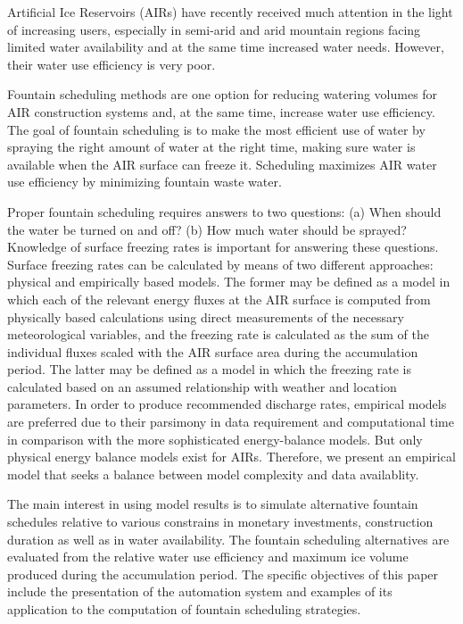 \documentclass[tc, manuscript]{copernicus}
\begin{document}
\introduction

Artificial Ice Reservoirs (AIRs) have recently received much attention in the light of increasing users,
especially in semi-arid and arid mountain regions facing limited water availability and at the same time
increased water needs. However, their water use efficiency is very poor. 

Fountain scheduling methods are one option for reducing watering volumes for AIR construction systems and, at
the same time, increase water use efficiency. The goal of fountain scheduling is to make the most efficient use of water by
spraying the right amount of water at the right time, making sure water is available when the AIR surface can
freeze it. Scheduling maximizes AIR water use efficiency by minimizing fountain waste water.  

Proper fountain scheduling requires answers to two questions: (a) When should the water be turned on and off?
(b) How much water should be sprayed? Knowledge of surface freezing rates is important for answering these
questions. Surface freezing rates can be calculated by means of two different approaches: physical
and empirically based models. The former may be defined as a model in which each of the relevant
energy fluxes at the AIR surface is computed from physically based calculations using direct measurements of the
necessary meteorological variables, and the freezing rate is calculated as the sum of the individual fluxes
scaled with the AIR surface area during the accumulation period. The latter may be defined as a model in which
the freezing rate is calculated based on an assumed relationship with weather and location parameters. In order
to produce recommended discharge rates, empirical models are preferred due to their parsimony in data
requirement and computational time in comparison with the more sophisticated energy-balance models. But only
physical energy balance models exist for AIRs. Therefore, we present an empirical model that seeks a balance
between model complexity and data availablity.

The main interest in using model results is to simulate alternative fountain schedules relative to various
constrains in monetary investments, construction duration as well as in water availability. The fountain
scheduling alternatives are evaluated from the relative water use efficiency and maximum ice volume produced
during the accumulation period. The specific objectives of this paper include the presentation of the automation
system and examples of its application to the computation of fountain scheduling strategies.
\end{document}
